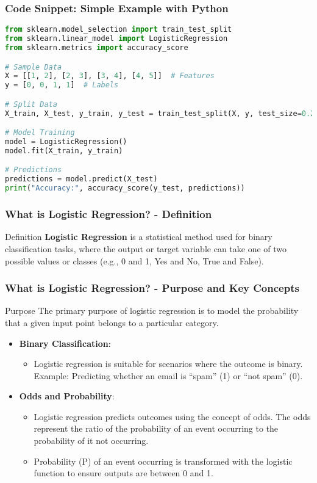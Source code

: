 \documentclass[aspectratio=169]{beamer}
\begin{document}
\begin{frame}[fragile]
    \frametitle{Code Snippet: Simple Example with Python}
    \begin{lstlisting}[language=Python]
from sklearn.model_selection import train_test_split
from sklearn.linear_model import LogisticRegression
from sklearn.metrics import accuracy_score

# Sample Data
X = [[1, 2], [2, 3], [3, 4], [4, 5]]  # Features
y = [0, 0, 1, 1]  # Labels

# Split Data
X_train, X_test, y_train, y_test = train_test_split(X, y, test_size=0.2)

# Model Training
model = LogisticRegression()
model.fit(X_train, y_train)

# Predictions
predictions = model.predict(X_test)
print("Accuracy:", accuracy_score(y_test, predictions))
    \end{lstlisting}
\end{frame}

\begin{frame}[fragile]
    \frametitle{What is Logistic Regression? - Definition}
    \begin{block}{Definition}
        \textbf{Logistic Regression} is a statistical method used for binary classification tasks, where the output or target variable can take one of two possible values or classes (e.g., 0 and 1, Yes and No, True and False).
    \end{block}
\end{frame}

\begin{frame}[fragile]
    \frametitle{What is Logistic Regression? - Purpose and Key Concepts}
    \begin{block}{Purpose}
        The primary purpose of logistic regression is to model the probability that a given input point belongs to a particular category.
    \end{block}

    \begin{itemize}
        \item \textbf{Binary Classification}:
        \begin{itemize}
            \item Logistic regression is suitable for scenarios where the outcome is binary. Example: Predicting whether an email is ``spam'' (1) or ``not spam'' (0).
        \end{itemize}
        
        \item \textbf{Odds and Probability}:
        \begin{itemize}
            \item Logistic regression predicts outcomes using the concept of odds. The odds represent the ratio of the probability of an event occurring to the probability of it not occurring.
            \item Probability (P) of an event occurring is transformed with the logistic function to ensure outputs are between 0 and 1.
        \end{itemize}
    \end{itemize}
\end{frame}
\end{document}
